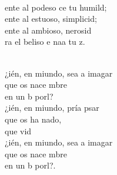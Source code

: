 \documentclass[12pt]{article}
\begin{document}
\begin{multicols*}{2}
\begin{cancion}
\begin{chorus}
	\end{chorus}%
	\jump\\
	ente al podeso ce tu humild;\\
	ente al estuoso,  simplicid;\\
	ente al ambioso, nerosid\\
	ra el beliso e naa tu z.\\\jump\\
	\begin{chorus}%
	¿ién, en miundo, sea a imagar \\
	que os nace mbre\\
	en un b porl?  \\
	¿ién, en miundo, pría psar \\
	que os ha nado,\\
	que  vid \\
	¿ién, en miundo, sea a imagar \\
	que os nace mbre\\
	en un b porl?. \\
	\end{chorus}%
	\jump\\
\end{cancion}%


\end{multicols*}
\end{document}
